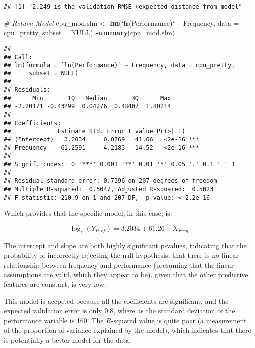 \documentclass[12pt]{article}
\newenvironment{Shaded}{\begin{snugshade}}{\end{snugshade}}
\newcommand{\CommentTok}[1]{\textcolor[rgb]{0.56,0.35,0.01}{\textit{#1}}}
\newcommand{\DataTypeTok}[1]{\textcolor[rgb]{0.13,0.29,0.53}{#1}}
\newcommand{\KeywordTok}[1]{\textcolor[rgb]{0.13,0.29,0.53}{\textbf{#1}}}
\newcommand{\NormalTok}[1]{#1}
\newcommand{\OperatorTok}[1]{\textcolor[rgb]{0.81,0.36,0.00}{\textbf{#1}}}
\newcommand{\OtherTok}[1]{\textcolor[rgb]{0.56,0.35,0.01}{#1}}
\newcommand{\StringTok}[1]{\textcolor[rgb]{0.31,0.60,0.02}{#1}}
\begin{document}
\begin{verbatim}
## [1] "2.249 is the validation RMSE (expected distance from model"
\end{verbatim}

\begin{Shaded}
\begin{Highlighting}[]
\CommentTok{# Return Model}
\NormalTok{cpu_mod.slm <-}\StringTok{ }\KeywordTok{lm}\NormalTok{(}\StringTok{`}\DataTypeTok{ln(Performance)}\StringTok{`} \OperatorTok{~}\StringTok{ }\NormalTok{Frequency, }\DataTypeTok{data =}\NormalTok{ cpu_pretty, }\DataTypeTok{subset =} \OtherTok{NULL}\NormalTok{)}
\KeywordTok{summary}\NormalTok{(cpu_mod.slm)}
\end{Highlighting}
\end{Shaded}

\begin{verbatim}
## 
## Call:
## lm(formula = `ln(Performance)` ~ Frequency, data = cpu_pretty, 
##     subset = NULL)
## 
## Residuals:
##      Min       1Q   Median       3Q      Max 
## -2.20171 -0.43299  0.04276  0.48407  1.80214 
## 
## Coefficients:
##             Estimate Std. Error t value Pr(>|t|)    
## (Intercept)   3.2034     0.0769   41.66   <2e-16 ***
## Frequency    61.2591     4.2183   14.52   <2e-16 ***
## ---
## Signif. codes:  0 '***' 0.001 '**' 0.01 '*' 0.05 '.' 0.1 ' ' 1
## 
## Residual standard error: 0.7396 on 207 degrees of freedom
## Multiple R-squared:  0.5047, Adjusted R-squared:  0.5023 
## F-statistic: 210.9 on 1 and 207 DF,  p-value: < 2.2e-16
\end{verbatim}

Which provides that the specific model, in this case, is:

\[
\log_e\left( Y_{Perf}   \right) = 3.2034 + 61.26 \times X_{Freq}
\]

The intercept and slope are both highly significant p-values, indicating
that the probability of incorrectly rejecting the null hypothesis, that
there is no linear relationship between frequency and performance
(presuming that the linear assumptions are valid, which they appear to
be), given that the other predictive features are constant, is very low.

This model is accpeted because all the coefficients are significant, and
the expected validation error is only 0.8, where as the standard
deviation of the performance variable is 160. The \(R\)-squared value is
quite poor (a measurement of the proportion of variance explained by the
model), which indicates that there is potentially a better model for the
data.
\end{document}
